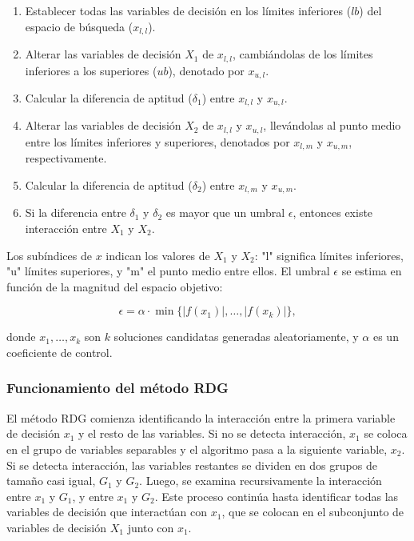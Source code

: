 \begin{enumerate}
    \item Establecer todas las variables de decisión en los límites inferiores (\(lb\)) del espacio de búsqueda (\(x_{l,l}\)).
    \item Alterar las variables de decisión \(X_1\) de \(x_{l,l}\), cambiándolas de los límites inferiores a los superiores (\(ub\)), denotado por \(x_{u,l}\).
    \item Calcular la diferencia de aptitud (\(\delta_1\)) entre \(x_{l,l}\) y \(x_{u,l}\).
    \item Alterar las variables de decisión \(X_2\) de \(x_{l,l}\) y \(x_{u,l}\), llevándolas al punto medio entre los límites inferiores y superiores, denotados por \(x_{l,m}\) y \(x_{u,m}\), respectivamente.
    \item Calcular la diferencia de aptitud (\(\delta_2\)) entre \(x_{l,m}\) y \(x_{u,m}\).
    \item Si la diferencia entre \(\delta_1\) y \(\delta_2\) es mayor que un umbral \(\epsilon\), entonces existe interacción entre \(X_1\) y \(X_2\).
\end{enumerate}

Los subíndices de \(x\) indican los valores de \(X_1\) y \(X_2\): "l" significa límites inferiores, "u" límites superiores, y "m" el punto medio entre ellos. El umbral \(\epsilon\) se estima en función de la magnitud del espacio objetivo:

\[
\epsilon = \alpha \cdot \min\{|f(x_1)|, \ldots, |f(x_k)|\},
\]

donde \(x_1, \ldots, x_k\) son \(k\) soluciones candidatas generadas aleatoriamente, y \(\alpha\) es un coeficiente de control.

\subsubsection{Funcionamiento del método RDG}
El método RDG comienza identificando la interacción entre la primera variable de decisión \(x_1\) y el resto de las variables. Si no se detecta interacción, \(x_1\) se coloca en el grupo de variables separables y el algoritmo pasa a la siguiente variable, \(x_2\). Si se detecta interacción, las variables restantes se dividen en dos grupos de tamaño casi igual, \(G_1\) y \(G_2\). Luego, se examina recursivamente la interacción entre \(x_1\) y \(G_1\), y entre \(x_1\) y \(G_2\). Este proceso continúa hasta identificar todas las variables de decisión que interactúan con \(x_1\), que se colocan en el subconjunto de variables de decisión \(X_1\) junto con \(x_1\).

